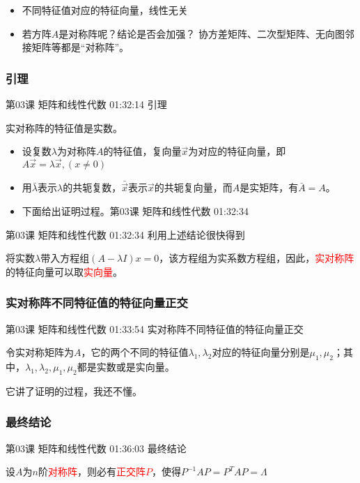 \documentclass[UTF8]{ctexart}
\begin{document}
\begin{itemize}
\item 不同特征值对应的特征向量，线性无关
\item 若方阵$A$是对称阵呢？结论是否会加强？ 协方差矩阵、二次型矩阵、无向图邻接矩阵等都是“对称阵”。
\end{itemize}

\subsubsection{引理}

第03课 矩阵和线性代数 01:32:14 引理

实对称阵的特征值是实数。

\begin{itemize}
\item 设复数$\lambda$为对称阵$A$的特征值，复向量$\vec{x}$为对应的特征向量，即$A\vec{x}=\lambda \vec{x},(x \neq 0)$
\item 用$\bar{\lambda}$表示$\lambda$的共轭复数，$\bar{\vec{x}}$表示$\vec{x}$的共轭复向量，而$A$是实矩阵，有$\bar{A}=A$。
\item 下面给出证明过程。第03课 矩阵和线性代数 01:32:34
\end{itemize}

第03课 矩阵和线性代数 01:32:34 利用上述结论很快得到

将实数$\lambda$带入方程组$(A-\lambda I)x=0$，该方程组为实系数方程组，因此，\textcolor{red}{实对称阵}的特征向量可以取\textcolor{red}{实向量}。

\subsubsection{实对称阵不同特征值的特征向量正交}

第03课 矩阵和线性代数 01:33:54 实对称阵不同特征值的特征向量正交

令实对称矩阵为$A$，它的两个不同的特征值$\lambda_{1},\lambda_{2}$对应的特征向量分别是$\mu_{1},\mu_{2}$；其中，$\lambda_{1},\lambda_{2},\mu_ {1},\mu_{2}$都是实数或是实向量。

它讲了证明的过程，我还不懂。

\subsubsection{最终结论}

第03课 矩阵和线性代数 01:36:03 最终结论

设$A$为$n$阶\textcolor{red}{对称阵}，则必有\textcolor{red}{正交阵$P$}，使得$P^{-1}AP=P^{T}AP=\Lambda$
\end{document}
